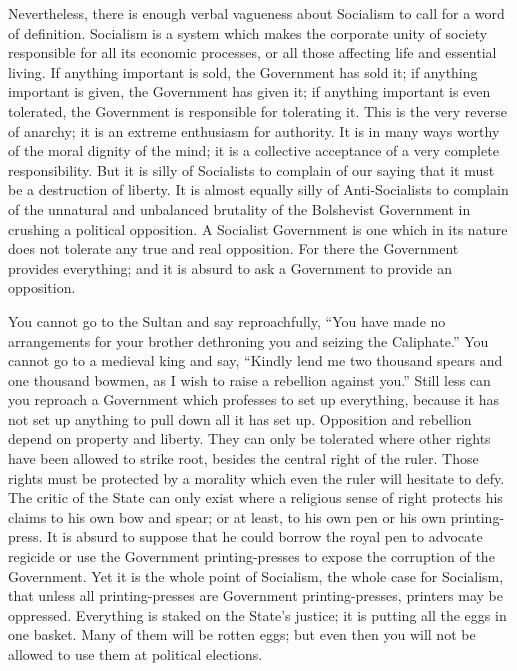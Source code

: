 \documentclass{book}
\begin{document}
Nevertheless, there is enough verbal vagueness about Socialism to call for a word of definition. Socialism is a system which makes the corporate unity of society responsible for all its economic processes, or all those affecting life and essential living. If anything important is sold, the Government has sold it; if anything important is given, the Government has given it; if anything important is even tolerated, the Government is responsible for tolerating it. This is the very reverse of anarchy; it is an extreme enthusiasm for authority. It is in many ways worthy of the moral dignity of the mind; it is a collective acceptance of a very complete responsibility. But it is silly of Socialists to complain of our saying that it must be a destruction of liberty. It is almost equally silly of Anti-Socialists to complain of the unnatural and unbalanced brutality of the Bolshevist Government in crushing a political opposition. A Socialist Government is one which in its nature does not tolerate any true and real opposition. For there the Government provides everything; and it is absurd to ask a Government to provide an opposition.

You cannot go to the Sultan and say reproachfully, “You have made no arrangements for your brother dethroning you and seizing the Caliphate.” You cannot go to a medieval king and say, “Kindly lend me two thousand spears and one thousand bowmen, as I wish to raise a rebellion against you.” Still less can you reproach a Government which professes to set up everything, because it has not set up anything to pull down all it has set up. Opposition and rebellion depend on property and liberty. They can only be tolerated where other rights have been allowed to strike root, besides the central right of the ruler. Those rights must be protected by a morality which even the ruler will hesitate to defy. The critic of the State can only exist where a religious sense of right protects his claims to his own bow and spear; or at least, to his own pen or his own printing-press. It is absurd to suppose that he could borrow the royal pen to advocate regicide or use the Government printing-presses to expose the corruption of the Government. Yet it is the whole point of Socialism, the whole case for Socialism, that unless all printing-presses are Government printing-presses, printers may be oppressed. Everything is staked on the State’s justice; it is putting all the eggs in one basket. Many of them will be rotten eggs; but even then you will not be allowed to use them at political elections.
\end{document}
